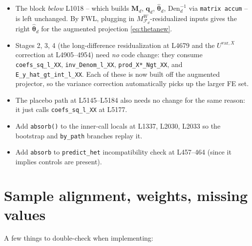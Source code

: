 \documentclass[11pt]{article}
\newcommand{\code}[1]{\texttt{\small #1}}
\newcommand{\1}{\mathbb{1}}
\newcommand{\thetad}{\widehat{\bm{\theta}}_d}
\newcommand{\MdW}{M^{\!W}_{\mathcal{F}_d}}
\begin{document}
\begin{itemize}[leftmargin=*, itemsep=2pt]
  \item The block \emph{below} L1018 -- which builds $\bm{M}_d$, $\bm{q}_d$,
        $\thetad$, $\mathrm{Den}_d^{-1}$ via \texttt{matrix accum} -- is left
        unchanged. By FWL, plugging in $\MdW$-residualized inputs gives the
        right $\thetad$ for the augmented projection \eqref{eq:thetanew}.
  \item Stages 2, 3, 4 (the long-difference residualization at L4679 and the
        $U^{\mathrm{var},X}$ correction at L4905--4954) need \emph{no} code
        change: they consume \code{coefs\_sq\_l\_XX},
        \code{inv\_Denom\_l\_XX}, \code{prod\_X*\_Ngt\_XX}, and
        \code{E\_y\_hat\_gt\_int\_l\_XX}. Each of these is now built off the
        augmented projector, so the variance correction automatically picks
        up the larger FE set.
  \item The placebo path at L5145--L5184 also needs no change for the same
        reason: it just calls \code{coefs\_sq\_l\_XX} at L5177.
  \item Add \code{absorb()} to the inner-call locals at L1337, L2030,
        L2033 so the bootstrap and \code{by\_path} branches replay it.
  \item Add \code{absorb} to \code{predict\_het} incompatibility check at
        L457--464 (since it implies controls are present).
\end{itemize}

\section{Sample alignment, weights, missing values}

A few things to double-check when implementing:
\end{document}
